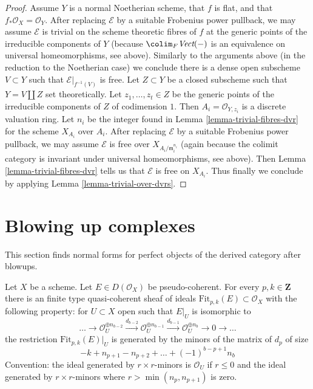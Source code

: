 \begin{proof}
\medskip\noindent
Assume $Y$ is a normal Noetherian scheme, that $f$ is flat, and
that $f_*\mathcal{O}_X = \mathcal{O}_Y$. After replacing $\mathcal{E}$
by a suitable Frobenius power pullback, we may assume $\mathcal{E}$
is trivial on the scheme theoretic fibres of $f$ at the generic points
of the irreducible components of $Y$ (because
$\colim_F \textit{Vect}(-)$ is an equivalence on universal
homeomorphisms, see above). Similarly to the arguments above
(in the reduction to the Noetherian case) we conclude there is a dense
open subscheme $V \subset Y$ such that $\mathcal{E}|_{f^{-1}(V)}$ is free.
Let $Z \subset Y$ be a closed subscheme such that
$Y = V \amalg Z$ set theoretically. Let $z_1, \ldots, z_t \in Z$
be the generic points of the irreducible components of $Z$
of codimension $1$. Then $A_i = \mathcal{O}_{Y, z_i}$ is
a discrete valuation ring. Let $n_i$ be the integer found in
Lemma \ref{lemma-trivial-fibres-dvr} for the scheme $X_{A_i}$ over $A_i$.
After replacing $\mathcal{E}$ by a suitable Frobenius
power pullback, we may assume $\mathcal{E}$ is free over
$X_{A_i/\mathfrak m_i^{n_i}}$ (again because the colimit category
is invariant under universal homeomorphisms, see above).
Then Lemma \ref{lemma-trivial-fibres-dvr} tells us that
$\mathcal{E}$ is free on $X_{A_i}$.
Thus finally we conclude by applying Lemma \ref{lemma-trivial-over-dvrs}.
\end{proof}










\section{Blowing up complexes}
\label{section-blowup-complexes}

\noindent
This section finds normal forms for perfect objects of the derived category
after blowups.

\begin{lemma}
\label{lemma-fitting-ideals-complex}
Let $X$ be a scheme. Let $E \in D(\mathcal{O}_X)$ be pseudo-coherent.
For every $p, k \in \mathbf{Z}$ there is an finite type quasi-coherent
sheaf of ideals $\text{Fit}_{p, k}(E) \subset \mathcal{O}_X$
with the following property: for $U \subset X$ open
such that $E|_U$ is isomorphic to
$$
\ldots \to
\mathcal{O}_U^{\oplus n_{b - 2}}
\xrightarrow{d_{b - 2}}
\mathcal{O}_U^{\oplus n_{b - 1}}
\xrightarrow{d_{b - 1}}
\mathcal{O}_U^{\oplus n_b} \to 0 \to \ldots
$$
the restriction $\text{Fit}_{p, k}(E)|_U$ is generated by the
minors of the matrix of $d_p$ of size
$$
- k + n_{p + 1} - n_{p + 2} + \ldots + (-1)^{b - p + 1} n_b
$$
Convention: the ideal generated by $r \times r$-minors
is $\mathcal{O}_U$ if $r \leq 0$ and the ideal generated by
$r \times r$-minors where $r > \min(n_p, n_{p + 1})$ is zero.
\end{lemma}

